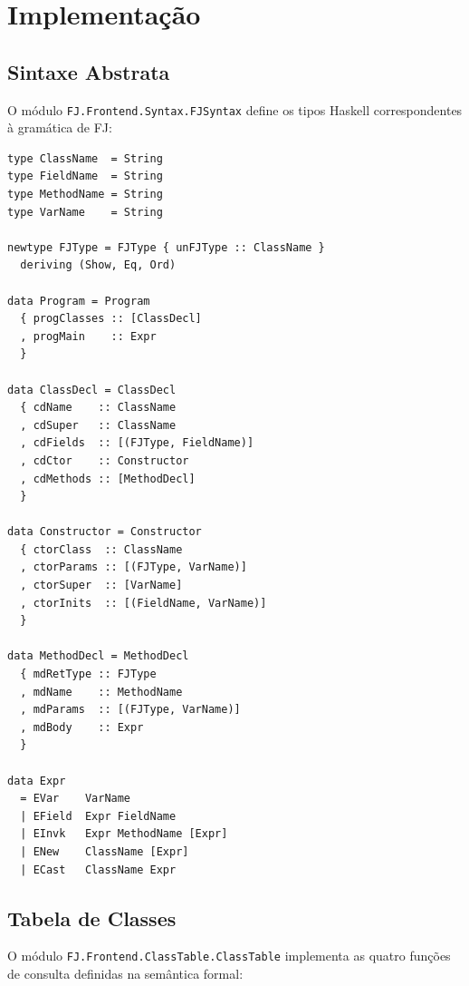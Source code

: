 \section{Implementação}

\subsection{Sintaxe Abstrata}

O módulo \texttt{FJ.Frontend.Syntax.FJSyntax} define
os tipos Haskell correspondentes à gramática de FJ:

\begin{verbatim}
type ClassName  = String
type FieldName  = String
type MethodName = String
type VarName    = String

newtype FJType = FJType { unFJType :: ClassName }
  deriving (Show, Eq, Ord)

data Program = Program
  { progClasses :: [ClassDecl]
  , progMain    :: Expr
  }

data ClassDecl = ClassDecl
  { cdName    :: ClassName
  , cdSuper   :: ClassName
  , cdFields  :: [(FJType, FieldName)]
  , cdCtor    :: Constructor
  , cdMethods :: [MethodDecl]
  }

data Constructor = Constructor
  { ctorClass  :: ClassName
  , ctorParams :: [(FJType, VarName)]
  , ctorSuper  :: [VarName]
  , ctorInits  :: [(FieldName, VarName)]
  }

data MethodDecl = MethodDecl
  { mdRetType :: FJType
  , mdName    :: MethodName
  , mdParams  :: [(FJType, VarName)]
  , mdBody    :: Expr
  }

data Expr
  = EVar    VarName
  | EField  Expr FieldName
  | EInvk   Expr MethodName [Expr]
  | ENew    ClassName [Expr]
  | ECast   ClassName Expr
\end{verbatim}

\subsection{Tabela de Classes}

O módulo \texttt{FJ.Frontend.ClassTable.ClassTable}
implementa as quatro funções de consulta definidas na semântica formal:

